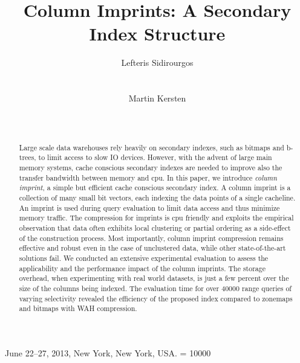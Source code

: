 \documentclass{sig-alternate}
\renewcommand{\it}{\textit}
\begin{document}
 {June 22--27, 2013, New York, New York, USA.}
\widowpenalty = 10000

\title{Column Imprints: A Secondary Index Structure}
\author{
\alignauthor Lefteris Sidirourgos\\
\\
\\
\alignauthor Martin Kersten\\
\\
\\
}

\maketitle

\begin{abstract}
Large scale data warehouses rely heavily on secondary indexes, such as bitmaps
and b-trees, to limit access to slow IO devices. However, with the advent
of large main memory systems, cache conscious secondary indexes are needed to
improve also the transfer bandwidth between memory and cpu. In this paper, we
introduce \it{column imprint}, a simple but efficient cache conscious secondary
index. A column imprint is a collection of many small bit vectors, each
indexing the data points of a single cacheline. An imprint is used during query
evaluation to limit data access and thus minimize memory traffic. The
compression for imprints is cpu friendly and exploits the empirical observation
that data often exhibits local clustering or partial ordering as a side-effect
of the construction process. Most importantly, column imprint compression
remains effective and robust even in the case of unclustered data, while other
state-of-the-art solutions fail. We conducted an extensive experimental
evaluation to assess the applicability and the performance impact of the column
imprints. The storage overhead, when experimenting with real world datasets, is
just a few percent over the size of the columns being indexed. The evaluation
time for over 40000 range queries of varying selectivity revealed the
efficiency of the proposed index compared to zonemaps and bitmaps with WAH
compression.
\end{abstract}










{\small}
%
\end{document}
